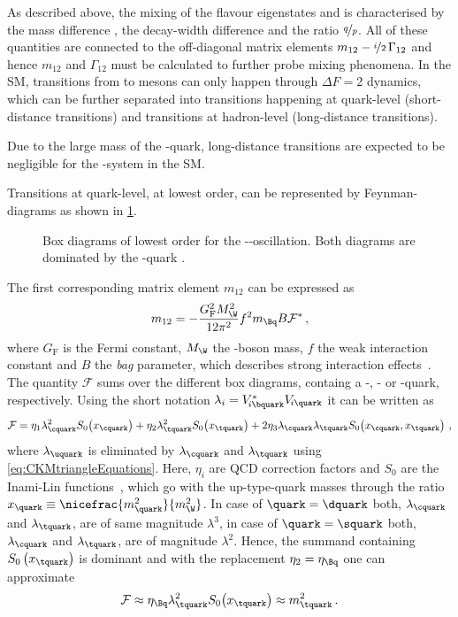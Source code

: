 As described above, the mixing of the flavour eigenstates \Bq and \Bqb is characterised by the mass difference \dm, the decay-width difference \DG and the ratio $\nicefrac{q}{p}$.
All of these quantities are connected to the off-diagonal matrix elements $m_{12}-\nicefrac{i}{2}\,\Gamma_{12}$ and hence $m_{12}$ and $\Gamma_{12}$ must be calculated to further probe mixing phenomena.
In the \ac{SM}, transitions from \Bq to \Bqb mesons can only happen through $\Delta F=2$ dynamics, which can be further separated into transitions happening at quark-level (short-distance transitions) and transitions at hadron-level (long-distance transitions).

Due to the large mass of the \bquark-quark, long-distance transitions are expected to be negligible for the \Bq-\Bqb system in the \ac{SM}.

Transitions at quark-level, at lowest order, can be represented by Feynman-diagrams as shown in \cref{fig:FeynmanMixing}.
\begin{figure}[tbp]
	\centering
	
	\hspace{0.5cm}
	
	\caption{Box diagrams of lowest order for the \Bz-\Bzb-oscillation. Both diagrams are dominated by the \tquark-quark \cite{Ellis:2016jkw}.}
	\label{fig:FeynmanMixing}
\end{figure}
The first corresponding matrix element $m_{12}$ can be expressed as
\begin{equation}
m_{12}=-\frac{G_{\text{F}}^2M_\W^2}{12\pi^2}f^2m_{\Bq}B\mathcal{F}^\ast\,, \label{eq:monetwo}
\end{equation}
where $G_{\text{F}}$ is the Fermi constant, $M_\W$ the \W-boson mass, $f$ the weak interaction constant and $B$ the \emph{bag} parameter, which describes strong interaction effects~\cite{Branco:396964}.
The quantity $\mathcal{F}$ sums over the different box diagrams, containg a \uquark-, \cquark- or \tquark-quark, respectively.
Using the short notation $\lambda_i=V^{*}_{{\kern -0.1em}i\bquark}V_{{\kern -0.1em}i\quark}$ it can be written as
\begin{equation}
\mathcal{F}=\eta_1\lambda_\cquark^2S_0\!\left(x_\cquark\right)+\eta_2\lambda_\tquark^2S_0\!\left(x_\tquark\right)
+2\eta_3\lambda_{\cquark}\lambda_{\tquark}S_0\!\left(x_\cquark,x_\tquark\right)\,,
\end{equation}
where $\lambda_\uquark$ is eliminated by $\lambda_\cquark$ and $\lambda_\tquark$ using \cref{eq:CKMtriangleEquations}.
Here, $\eta_i$ are QCD correction factors and $S_0$ are the Inami-Lin functions~\cite{Inami:1980fz}, which go with the up-type-quark masses through the ratio $x_\quark\equiv\nicefrac{m_\quark^2}{m_\W^2}$.
In case of $\quark=\dquark$ both, $\lambda_\cquark$ and $\lambda_\tquark$, are of same magnitude $\lambda^3$, in case of $\quark=\squark$ both, $\lambda_\cquark$ and $\lambda_\tquark$, are of magnitude $\lambda^2$.
Hence, the summand containing $S_0\left(x_\tquark\right)$ is dominant and with the replacement $\eta_2=\eta_\Bq$ one can approximate
\begin{equation}
\mathcal{F}\approx\eta_\Bq\lambda_\tquark^2S_0\!\left(x_\tquark\right)\approx m_\tquark^2\,.
\end{equation}

